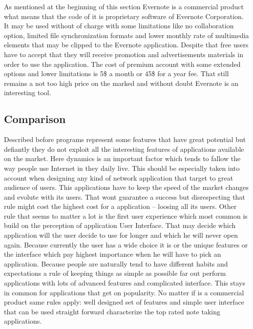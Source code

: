 As mentioned at the beginning of this section Evernote is a commercial product what means that the code of it is proprietary software of Evernote Corporation. It may be used without of charge with some limitations like no collaboration option, limited file synchronization formats and lower monthly rate of multimedia elements that may be clipped to the Evernote application. Despite that free users have to accept that they will receive promotion and advertisements  materials in order to use the application. The cost of premium account with some extended options and lower limitations is 5\$ a month or 45\$ for a year fee. That still remains a not too high price on the marked and without doubt Evernote is an interesting tool.      
 
\subsection{Comparison}
Described before programs represent some features that have great potential but defiantly they do not exploit all the interesting features of applications available on the market. Here dynamics is an important factor which tends to fallow the way people use Internet in they daily live. This should be especially taken into account when designing any kind of network application that target to great audience of users. This applications have to keep the speed of the market changes and evolute with its users. That wont guarantee a success but disrespecting that rule might cost the highest cost for a application -- loosing all its users. Other rule that seems to matter a lot is the first user experience which most common is build on the perception of application User Interface. That may decide which application will the user decide to use for longer and which he will never open again. Because currently the user has a wide choice it is or the unique features or the interface which pay highest importance when he will have to pick an application. Because people are naturally tend to have different habits and expectations a rule of keeping things as simple as possible far out perform applications with lots of advanced features and complicated interface. This stays in common for applications that get on popularity. No matter if is a commercial product same rules apply: well designed set of features and simple user interface that can be used straight forward characterize the top rated note taking applications. 
 
